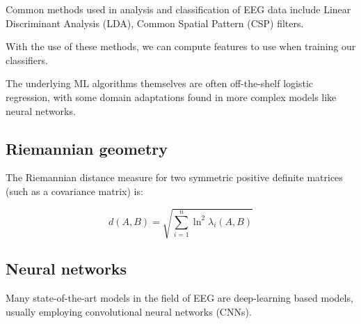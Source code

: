     Common methods used in analysis and classification of EEG data include Linear Discriminant Analysis (LDA), Common Spatial Pattern (CSP) filters.

    With the use of these methods, we can compute features to use when training our classifiers.

    The underlying ML algorithms themselves are often off-the-shelf logistic regression, with some domain adaptations found in more complex models like neural networks.


    \subsection{Riemannian geometry}


        The Riemannian distance measure for two symmetric positive definite matrices (such as a covariance matrix) is:~\cite{grafarend_metric_2003}

        \[ d(A, B) = \sqrt{\sum_{i=1}^{n} \ln^2 \lambda_i (A, B) } \]

    \subsection{Neural networks}

        Many state-of-the-art models in the field of EEG are deep-learning based models, usually employing convolutional neural networks (CNNs).
